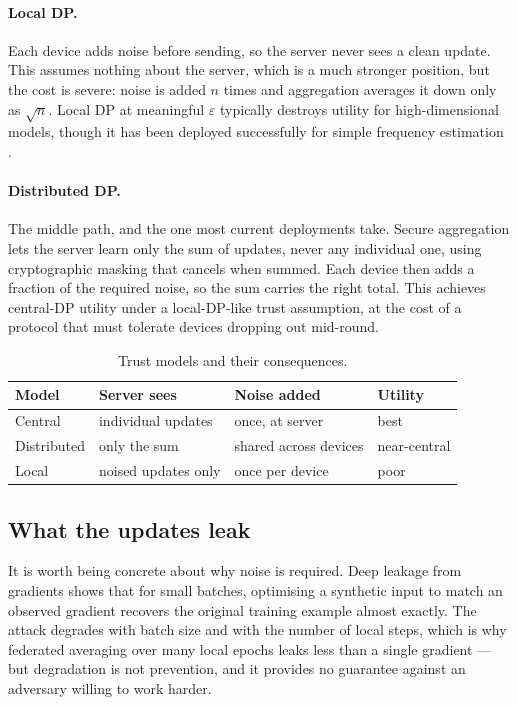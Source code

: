\documentclass[11pt,a4paper]{article}
\begin{document}
\paragraph{Local DP.}
Each device adds noise before sending, so the server never sees a clean
update. This assumes nothing about the server, which is a much stronger
position, but the cost is severe: noise is added $n$ times and aggregation
averages it down only as $\sqrt{n}$. Local DP at meaningful $\varepsilon$
typically destroys utility for high-dimensional models, though it has been
deployed successfully for simple frequency estimation \cite{erlingsson2014}.

\paragraph{Distributed DP.}
The middle path, and the one most current deployments take. Secure aggregation
\cite{bonawitz2017} lets the server learn only the sum of updates, never any
individual one, using cryptographic masking that cancels when summed. Each
device then adds a fraction of the required noise, so the sum carries the
right total. This achieves central-DP utility under a local-DP-like trust
assumption, at the cost of a protocol that must tolerate devices dropping out
mid-round.

\begin{table}[htbp]
  \centering
  \caption{Trust models and their consequences.}
  \label{tab:trust}
  \begin{tabular}{llll}
    \toprule
    \textbf{Model} & \textbf{Server sees} & \textbf{Noise added} &
      \textbf{Utility} \\
    \midrule
    Central \cite{abadi2016}       & individual updates & once, at server  & best \\
    Distributed \cite{bonawitz2017} & only the sum      & shared across devices & near-central \\
    Local \cite{erlingsson2014}    & noised updates only & once per device & poor \\
    \bottomrule
  \end{tabular}
\end{table}

\subsection{What the updates leak}

It is worth being concrete about why noise is required. Deep leakage from
gradients \cite{zhu2019} shows that for small batches, optimising a synthetic
input to match an observed gradient recovers the original training example
almost exactly. The attack degrades with batch size and with the number of
local steps, which is why federated averaging over many local epochs leaks
less than a single gradient --- but degradation is not prevention, and it
provides no guarantee against an adversary willing to work harder.
\end{document}
